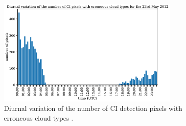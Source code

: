 \begin{figure}
\centering
\includegraphics[width=0.8\textwidth]{Grafiken/Abbildungen/ci_cloud_types_time.pdf}
\caption{Diurnal variation of the number of CI detection pixels with erroneous cloud types .}
\label{fig:ci_cloud_type_time}
\end{figure}